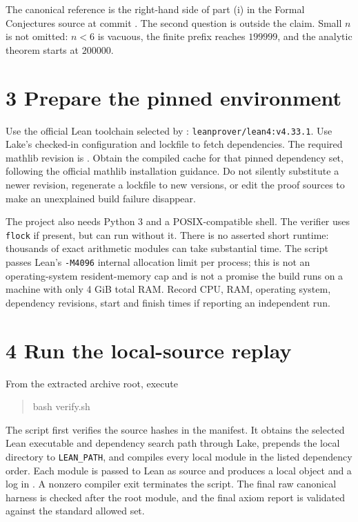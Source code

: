 \documentclass[10pt,letterpaper]{article}
\begin{document}
The canonical reference is the right-hand side of part (i) in the Formal Conjectures source at commit . The second question is outside the claim. Small $n$ is not omitted: $n<6$ is vacuous, the finite prefix reaches $199999$, and the analytic theorem starts at $200000$.

\section*{3 Prepare the pinned environment}
Use the official Lean toolchain selected by : \texttt{leanprover/lean4:v4.33.1}. Use Lake's checked-in configuration and lockfile to fetch dependencies. The required mathlib revision is . Obtain the compiled cache for that pinned dependency set, following the official mathlib installation guidance. Do not silently substitute a newer revision, regenerate a lockfile to new versions, or edit the proof sources to make an unexplained build failure disappear.

The project also needs Python 3 and a POSIX-compatible shell. The verifier uses \texttt{flock} if present, but can run without it. There is no asserted short runtime: thousands of exact arithmetic modules can take substantial time. The script passes Lean's \texttt{-M4096} internal allocation limit per process; this is not an operating-system resident-memory cap and is not a promise the build runs on a machine with only 4 GiB total RAM. Record CPU, RAM, operating system, dependency revisions, start and finish times if reporting an independent run.

\clearpage
\section*{4 Run the local-source replay}
From the extracted archive root, execute
\begin{quote}\ttfamily
bash verify.sh
\end{quote}
The script first verifies the source hashes in the manifest. It obtains the selected Lean executable and dependency search path through Lake, prepends the local directory to \texttt{LEAN\_PATH}, and compiles every local module in the listed dependency order. Each module is passed to Lean as source and produces a local object and a log in . A nonzero compiler exit terminates the script. The final raw canonical harness is checked after the root module, and the final axiom report is validated against the standard allowed set.
\end{document}

